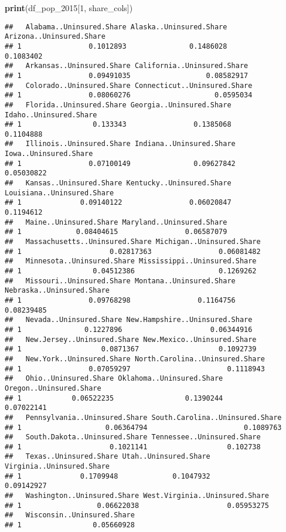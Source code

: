 \documentclass[
]{article}
\newenvironment{Shaded}{\begin{snugshade}}{\end{snugshade}}
\newcommand{\DecValTok}[1]{\textcolor[rgb]{0.00,0.00,0.81}{#1}}
\newcommand{\FunctionTok}[1]{\textcolor[rgb]{0.13,0.29,0.53}{\textbf{#1}}}
\newcommand{\NormalTok}[1]{#1}
\begin{document}
\begin{Shaded}
\begin{Highlighting}[]
\FunctionTok{print}\NormalTok{(df\_pop\_2015[}\DecValTok{1}\NormalTok{, share\_cols])}
\end{Highlighting}
\end{Shaded}

\begin{verbatim}
##   Alabama..Uninsured.Share Alaska..Uninsured.Share Arizona..Uninsured.Share
## 1                0.1012893               0.1486028                0.1083402
##   Arkansas..Uninsured.Share California..Uninsured.Share
## 1                0.09491035                  0.08582917
##   Colorado..Uninsured.Share Connecticut..Uninsured.Share
## 1                0.08060276                    0.0595034
##   Florida..Uninsured.Share Georgia..Uninsured.Share Idaho..Uninsured.Share
## 1                 0.133343                0.1385068              0.1104888
##   Illinois..Uninsured.Share Indiana..Uninsured.Share Iowa..Uninsured.Share
## 1                0.07100149               0.09627842            0.05030822
##   Kansas..Uninsured.Share Kentucky..Uninsured.Share Louisiana..Uninsured.Share
## 1              0.09140122                0.06020847                  0.1194612
##   Maine..Uninsured.Share Maryland..Uninsured.Share
## 1             0.08404615                0.06587079
##   Massachusetts..Uninsured.Share Michigan..Uninsured.Share
## 1                     0.02817363                0.06081482
##   Minnesota..Uninsured.Share Mississippi..Uninsured.Share
## 1                 0.04512386                    0.1269262
##   Missouri..Uninsured.Share Montana..Uninsured.Share Nebraska..Uninsured.Share
## 1                0.09768298                0.1164756                0.08239485
##   Nevada..Uninsured.Share New.Hampshire..Uninsured.Share
## 1               0.1227896                     0.06344916
##   New.Jersey..Uninsured.Share New.Mexico..Uninsured.Share
## 1                   0.0871367                   0.1092739
##   New.York..Uninsured.Share North.Carolina..Uninsured.Share
## 1                0.07059297                       0.1118943
##   Ohio..Uninsured.Share Oklahoma..Uninsured.Share Oregon..Uninsured.Share
## 1            0.06522235                 0.1390244              0.07022141
##   Pennsylvania..Uninsured.Share South.Carolina..Uninsured.Share
## 1                    0.06364794                       0.1089763
##   South.Dakota..Uninsured.Share Tennessee..Uninsured.Share
## 1                     0.1021141                   0.102738
##   Texas..Uninsured.Share Utah..Uninsured.Share Virginia..Uninsured.Share
## 1              0.1709948             0.1047932                0.09142927
##   Washington..Uninsured.Share West.Virginia..Uninsured.Share
## 1                  0.06622038                     0.05953275
##   Wisconsin..Uninsured.Share
## 1                 0.05660928
\end{verbatim}
\end{document}
